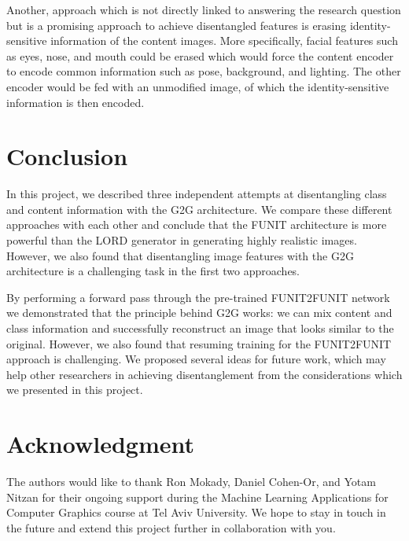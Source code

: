 \documentclass[conference]{IEEEtran}
\begin{document}
Another, approach which is not directly linked to answering the research question but is a promising approach to achieve disentangled features is erasing identity-sensitive information of the content images. More specifically, facial features such as eyes, nose, and mouth could be erased which would force the content encoder to encode common information such as pose, background, and lighting. The other encoder would be fed with an unmodified image, of which the identity-sensitive information is then encoded.

\label{chap7_conclusion}
\section{Conclusion}
In this project, we described three independent attempts at disentangling class and content information with the G2G architecture. We compare these different approaches with each other and conclude that the FUNIT architecture is more powerful than the LORD generator in generating highly realistic images. However, we also found that disentangling image features with the G2G architecture is a challenging task in the first two approaches. 

By performing a forward pass through the pre-trained FUNIT2FUNIT network we demonstrated that the principle behind G2G works: we can mix content and class information and successfully reconstruct an image that looks similar to the original. However, we also found that resuming training for the FUNIT2FUNIT approach is challenging. We proposed several ideas for future work, which may help other researchers in achieving disentanglement from the considerations which we presented in this project.

\section*{Acknowledgment}
The authors would like to thank Ron Mokady, Daniel Cohen-Or, and Yotam Nitzan for their ongoing support during the Machine Learning Applications for Computer Graphics course at Tel Aviv University. We hope to stay in touch in the future and extend this project further in collaboration with you.

\printbibliography
\end{document}
